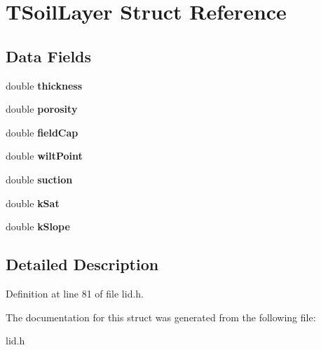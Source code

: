 \hypertarget{struct_t_soil_layer}{}\section{T\+Soil\+Layer Struct Reference}
\label{struct_t_soil_layer}
\subsection*{Data Fields}
\begin{DoxyCompactItemize}
\item 
\mbox{\label{struct_t_soil_layer_a20238819f2c84ce6d3f083ded9ac612d}} 
double {\bfseries thickness}
\item 
\mbox{\label{struct_t_soil_layer_a38299b3e08d348a2a1c11cac9a7f01bd}} 
double {\bfseries porosity}
\item 
\mbox{\label{struct_t_soil_layer_a7724c169829ff6c453e98fb65f96509b}} 
double {\bfseries field\+Cap}
\item 
\mbox{\label{struct_t_soil_layer_a91ca477b39d2e6e0401146b8216b854e}} 
double {\bfseries wilt\+Point}
\item 
\mbox{\label{struct_t_soil_layer_a4831c796d076e27cd33efcc25983c6ff}} 
double {\bfseries suction}
\item 
\mbox{\label{struct_t_soil_layer_a8e493f06916cda5a3fc90418c0b6b3f6}} 
double {\bfseries k\+Sat}
\item 
\mbox{\label{struct_t_soil_layer_a6e0e651c943f5f34ec4ae86899639bb5}} 
double {\bfseries k\+Slope}
\end{DoxyCompactItemize}


\subsection{Detailed Description}


Definition at line 81 of file lid.\+h.



The documentation for this struct was generated from the following file\+:\begin{DoxyCompactItemize}
\item 
lid.\+h\end{DoxyCompactItemize}
